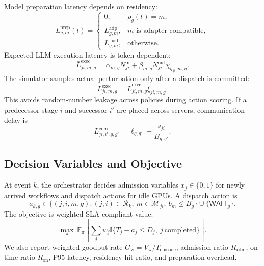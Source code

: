 \documentclass[10pt,conference]{IEEEtran}
\newcommand{\calR}{\mathcal{R}}
\newcommand{\calM}{\mathcal{M}}
\newcommand{\ind}{\mathbb{I}}
\begin{document}
Model preparation latency depends on residency:
\begin{equation}
L^{\mathrm{prep}}_{g,m}(t)=
\begin{cases}
0, & \rho_g(t)=m,\\
L^{\mathrm{adp}}_{g,m}, & m \text{ is adapter-compatible},\\
L^{\mathrm{load}}_{g,m}, & \text{otherwise}.
\end{cases}
\end{equation}
Expected LLM execution latency is token-dependent:
\begin{equation}
\bar L^{\mathrm{exec}}_{ji,m,g}=
\alpha_{m,g}N^{\mathrm{in}}_{ji}+\beta_{m,g}N^{\mathrm{out}}_{ji}
\chi_{q_{ji},m,g}.
\end{equation}
The simulator samples actual perturbation only after a dispatch is committed:
\begin{equation}
L^{\mathrm{exec}}_{ji,m,g}=\bar L^{\mathrm{exec}}_{ji,m,g}\xi_{ji,m,g}.
\end{equation}
This avoids random-number leakage across policies during action scoring. If a predecessor stage \(i\) and successor \(i'\) are placed across servers, communication delay is
\begin{equation}
L^{\mathrm{com}}_{ji,i',g,g'}=\ell_{g,g'}+\frac{s_{ji}}{B_{g,g'}}.
\end{equation}

\subsection{Decision Variables and Objective}

At event \(k\), the orchestrator decides admission variables \(x_j\in\{0,1\}\) for newly arrived workflows and dispatch actions for idle GPUs. A dispatch action is
\begin{equation}
a_{k,g}\in
\{(j,i,m,g):(j,i)\in\calR_k,~m\in\calM_{ji},~b_m\le B_g\}
\cup\{\textsf{WAIT}_g\}.
\end{equation}
The objective is weighted SLA-compliant value:
\begin{equation}
\max_{\pi}~
\mathbb{E}_{\pi}\left[
\sum_{j} w_j \ind\{T_j-a_j\le D_j,~j\mathrm{~completed}\}
\right].
\label{eq:objective}
\end{equation}
We also report weighted goodput rate \(G_{\mathrm{w}}=V_{\mathrm{w}}/T_{\mathrm{episode}}\), admission ratio \(R_{\mathrm{adm}}\), on-time ratio \(R_{\mathrm{on}}\), P95 latency, residency hit ratio, and preparation overhead.
\end{document}
